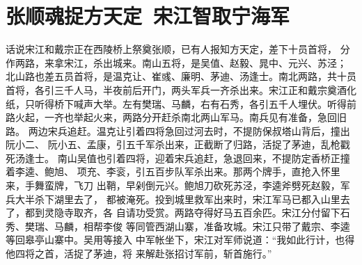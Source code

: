\chapter{张顺魂捉方天定~宋江智取宁海军}

话说宋江和戴宗正在西陵桥上祭奠张顺，已有人报知方天定，差下十员首将，
分作两路，来拿宋江，杀出城来。南山五将，是吴值、赵毅、晁中、元兴、苏泾；
北山路也差五员首将，是温克让、崔彧、廉明、茅迪、汤逢士。南北两路，共十员
首将，各引三千人马，半夜前后开门，两头军兵一齐杀出来。宋江正和戴宗奠酒化
纸，只听得桥下喊声大举。左有樊瑞、马麟，右有石秀，各引五千人埋伏。听得前
路火起，一齐也举起火来，两路分开赶杀南北两山军马。南兵见有准备，急回旧路。
两边宋兵追赶。温克让引着四将急回过河去时，不提防保叔塔山背后，撞出阮小二、
阮小五、孟康，引五千军杀出来，正截断了归路，活捉了茅迪，乱枪戳死汤逢士。
南山吴值也引着四将，迎着宋兵追赶，急退回来，不提防定香桥正撞着李逵、鲍旭、
项充、李衮，引五百步队军杀出来。那两个牌手，直抢入怀里来，手舞蛮牌，飞刀
出鞘，早剁倒元兴。鲍旭刀砍死苏泾，李逵斧劈死赵毅，军兵大半杀下湖里去了，
都被淹死。投到城里救军出来时，宋江军马已都入山里去了，都到灵隐寺取齐，各
自请功受赏。两路夺得好马五百余匹。宋江分付留下石秀、樊瑞、马麟，相帮李俊
等同管西湖山寨，准备攻城。宋江只带了戴宗、李逵等回皋亭山寨中。吴用等接入
中军帐坐下，宋江对军师说道：“我如此行计，也得他四将之首，活捉了茅迪，将
来解赴张招讨军前，斩首施行。”

